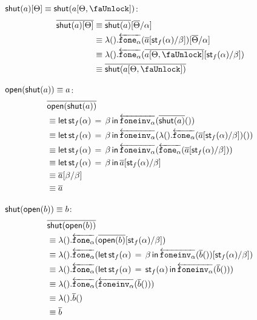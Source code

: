 \documentclass[10pt]{article}
\theoremstyle{definition}
\newcommand{\rewrite}[2]{\overleftarrow{#1}(#2)}
\newcommand\UE[2]{\ensuremath{#1(#2)}}
\newcommand\UI[2]{\ensuremath{\lambda #1.#2}}
\newcommand\StI[2]{\ensuremath{\mathsf{st}_{#1}(#2)}}
\newcommand\StE[4]{\ensuremath{\mathsf{let} \, \StI{#1}{#3} \, = \, {#2} \, \mathsf{in} \, #4}}
\begin{document}
\begin{enumerate}[style = multiline, labelwidth = 80pt]
\item[{$\RI{a}[\Theta] \equiv \RI{a[\Theta, \lock]}$}:] 
\begin{align*}
\upstairs{\RI{a}[\Theta]}
&\equiv \upstairs{\RI{a}}[\upstairs{\Theta}/\alpha] \\
&\equiv \UI{()}{\rewrite{\fone{\alpha}}{\upstairs{a}[\StI{f}{\alpha}/\beta]}}[\upstairs{\Theta}/\alpha] \\
&\equiv \UI{()}{\rewrite{\fone{\alpha}}{\upstairs{a[\Theta, \lock]}[\StI{f}{\alpha}/\beta]}} \\
&\equiv \upstairs{\RI{a[\Theta, \lock]}}
\end{align*}

\item[{$\mathsf{open}({\mathsf{shut}({a})}) \equiv a$}:] 
\begin{align*}
&\upstairs{\RE{\RI{a}}} \\
&\equiv \StE{f}{\beta}{\alpha}{\rewrite{\foneinv{\alpha}}{\UE{\upstairs{\RI{a}}}{}}} \\
&\equiv \StE{f}{\beta}{\alpha}{\rewrite{\foneinv{\alpha}}{\UE{\UI{()}{\rewrite{\fone{\alpha}}{\upstairs{a}[\StI{f}{\alpha}/\beta]}}}{}}} \\
&\equiv \StE{f}{\beta}{\alpha}{\rewrite{\foneinv{\alpha}}{\rewrite{\fone{\alpha}}{\upstairs{a}[\StI{f}{\alpha}/\beta]}}} \\
&\equiv \StE{f}{\beta}{\alpha}{\upstairs{a}[\StI{f}{\alpha}/\beta]} \\
&\equiv \upstairs{a}[\beta/\beta] \\
&\equiv \upstairs{a}
\end{align*}

\item[{$\mathsf{shut}({\mathsf{open}({b})}) \equiv b$}:] 
\begin{align*}
&\upstairs{\RI{\RE{b}}} \\
&\equiv \UI{()}{\rewrite{\fone{\alpha}}{\upstairs{\RE{b}}[\StI{f}{\alpha}/\beta]}} \\
&\equiv \UI{()}{\rewrite{\fone{\alpha}}{\StE{f}{\beta}{\alpha}{\rewrite{\foneinv{\alpha}}{\UE{\upstairs{b}}{}}}[\StI{f}{\alpha}/\beta]}} \\
&\equiv \UI{()}{\rewrite{\fone{\alpha}}{\StE{f}{\StI{f}{\alpha}}{\alpha}{\rewrite{\foneinv{\alpha}}{\UE{\upstairs{b}}{}}}}} \\
&\equiv \UI{()}{\rewrite{\fone{\alpha}}{\rewrite{\foneinv{\alpha}}{\UE{\upstairs{b}}{}}}} \\
&\equiv \UI{()}{\UE{\upstairs{b}}{}} \\
&\equiv \upstairs{b}
\end{align*}
\end{enumerate}
\end{document}
